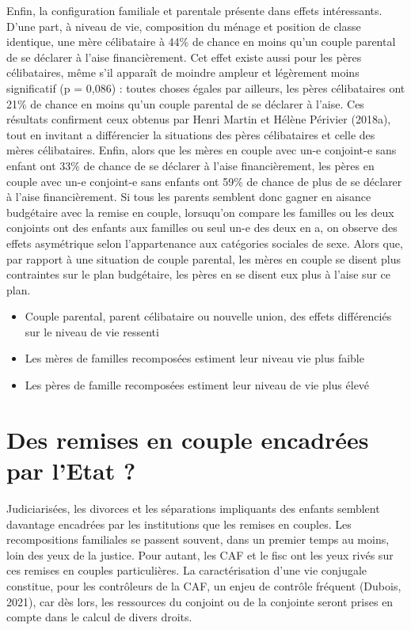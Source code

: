 \documentclass[
  12pt,
]{book}
\begin{document}
Enfin, la configuration familiale et parentale présente dans effets
intéressants. D'une part, à niveau de vie, composition du ménage et
position de classe identique, une mère célibataire à 44\% de chance en
moins qu'un couple parental de se déclarer à l'aise financièrement. Cet
effet existe aussi pour les pères célibataires, même s'il apparaît de
moindre ampleur et légèrement moins significatif (p = 0,086) : toutes
choses égales par ailleurs, les pères célibataires ont 21\% de chance en
moins qu'un couple parental de se déclarer à l'aise. Ces résultats
confirment ceux obtenus par Henri Martin et Hélène Périvier (2018a),
tout en invitant a différencier la situations des pères célibataires et
celle des mères célibataires. Enfin, alors que les mères en couple avec
un-e conjoint-e sans enfant ont 33\% de chance de se déclarer à l'aise
financièrement, les pères en couple avec un-e conjoint-e sans enfants
ont 59\% de chance de plus de se déclarer à l'aise financièrement. Si
tous les parents semblent donc gagner en aisance budgétaire avec la
remise en couple, lorsuqu'on compare les familles ou les deux conjoints
ont des enfants aux familles ou seul un-e des deux en a, on observe des
effets asymétrique selon l'appartenance aux catégories sociales de sexe.
Alors que, par rapport à une situation de couple parental, les mères en
couple se disent plus contraintes sur le plan budgétaire, les pères en
se disent eux plus à l'aise sur ce plan.

\begin{itemize}
\item
  Couple parental, parent célibataire ou nouvelle union, des effets
  différenciés sur le niveau de vie ressenti
\item
  Les mères de familles recomposées estiment leur niveau vie plus faible
\item
  Les pères de famille recomposées estiment leur niveau de vie plus
  élevé
\end{itemize}

\section{Des remises en couple encadrées par l'Etat
?}\label{des-remises-en-couple-encadruxe9es-par-letat}

Judiciarisées, les divorces et les séparations impliquants des enfants
semblent davantage encadrées par les institutions que les remises en
couples. Les recompositions familiales se passent souvent, dans un
premier temps au moins, loin des yeux de la justice. Pour autant, les
CAF et le fisc ont les yeux rivés sur ces remises en couples
particulières. La caractérisation d'une vie conjugale constitue, pour
les contrôleurs de la CAF, un enjeu de contrôle fréquent (Dubois, 2021),
car dès lors, les ressources du conjoint ou de la conjointe seront
prises en compte dans le calcul de divers droits.
\end{document}
